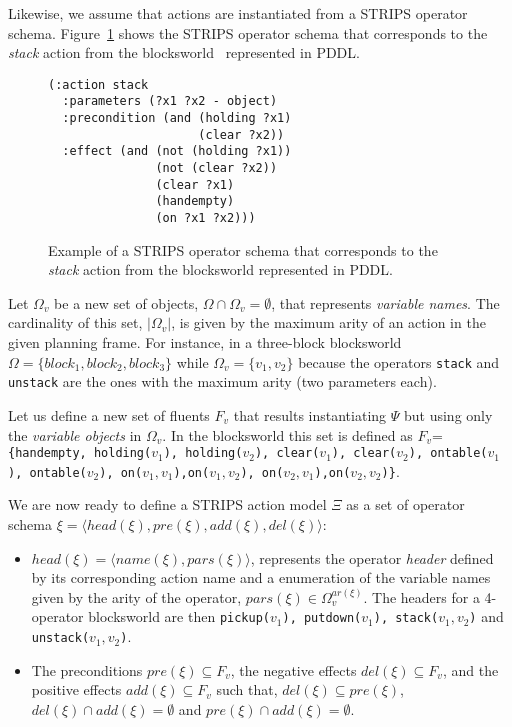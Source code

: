\documentclass[letterpaper]{article} %
\newcommand{\tup}[1]{{\langle #1 \rangle}}
\begin{document}
Likewise, we assume that actions are instantiated from a STRIPS operator schema. Figure~\ref{fig:stack} shows the STRIPS operator schema that corresponds to the {\em stack} action from the blocksworld~\cite{slaney2001blocks} represented in PDDL.
\begin{figure}[hbt]
\begin{footnotesize}
\begin{verbatim}
(:action stack
  :parameters (?x1 ?x2 - object)
  :precondition (and (holding ?x1) 
                     (clear ?x2))
  :effect (and (not (holding ?x1)) 
               (not (clear ?x2))
               (clear ?x1) 
               (handempty) 
               (on ?x1 ?x2)))
\end{verbatim}
\end{footnotesize}
 \caption{\small Example of a STRIPS operator schema that corresponds to the {\em stack} action from the blocksworld represented in PDDL.}
\label{fig:stack}
\end{figure}

Let $\Omega_v$ be a new set of objects, $\Omega\cap\Omega_v=\emptyset$, that represents {\em variable names}. The cardinality of this set, $|\Omega_v|$, is given by the maximum arity of an action in the given planning frame. For instance, in a three-block blocksworld $\Omega=\{block_1, block_2, block_3\}$ while $\Omega_v=\{v_1, v_2\}$ because the operators {\small\tt stack} and {\small\tt unstack} are the ones with the maximum arity (two parameters each). 

Let us define a new set of fluents $F_{v}$ that results instantiating $\Psi$ but using only the {\em variable objects} in $\Omega_v$. In the blocksworld this set is defined as $F_v$={\small\tt\{handempty, holding($v_1$), holding($v_2$), clear($v_1$), clear($v_2$), ontable($v_1$), ontable($v_2$), on($v_1,v_1$),on($v_1,v_2$), on($v_2,v_1$),on($v_2,v_2$)\}}.

We are now ready to define a STRIPS action model $\Xi$ as a set of operator schema $\xi=\tup{head(\xi),pre(\xi),add(\xi),del(\xi)}$:
\begin{itemize}
\item $head(\xi)=\tup{name(\xi),pars(\xi)}$, represents the operator {\em header} defined by its corresponding action name and a enumeration of the variable names given by the arity of the operator, $pars(\xi)\in\Omega_v^{ar(\xi)}$. The headers for a 4-operator blocksworld are then {\small\tt pickup($v_1$), putdown($v_1$), stack($v_1,v_2$)} and {\small\tt unstack($v_1,v_2$)}.
\item The preconditions $pre(\xi)\subseteq F_v$, the negative effects $del(\xi)\subseteq F_v$, and the positive effects $add(\xi)\subseteq F_v$ such that, $del(\xi)\subseteq pre(\xi)$, $del(\xi)\cap add(\xi)=\emptyset$ and $pre(\xi)\cap add(\xi)=\emptyset$.
\end{itemize}
\end{document}
